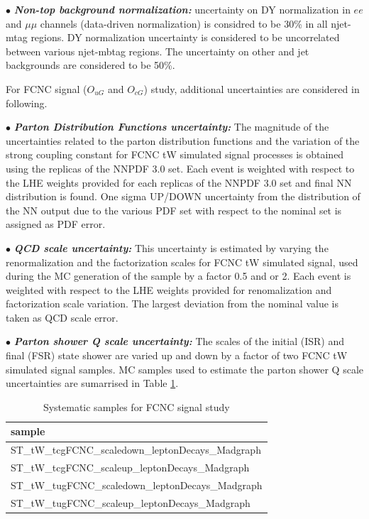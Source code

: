 $\bullet$ \textit{\textbf{Non-top background normalization:}} uncertainty on DY normalization in $ee$ and $\mu\mu$ channels (data-driven normalization) is considred to be 30\% in all njet-mtag regions. DY normalization uncertainty is considered to be uncorrelated between various njet-mbtag regions. The uncertainty on other and jet backgrounds are considered to be 50\%.

\medskip
For FCNC signal ($O_{uG}$ and $O_{cG}$) study, additional uncertainties are considered in following.

   $\bullet$ \textit{\textbf{Parton Distribution Functions uncertainty:}} The magnitude of the uncertainties related to the parton distribution functions and the variation of the strong coupling constant for FCNC tW simulated signal processes is obtained using the replicas of the NNPDF 3.0 set. Each event is weighted with respect to the LHE weights provided for each replicas of the NNPDF 3.0 set and final NN distribution is found. One sigma UP/DOWN uncertainty from the distribution of the NN output due to the various PDF set  with respect to  the nominal set is assigned as PDF error.

   $\bullet$ \textit{\textbf{QCD scale uncertainty:}} This uncertainty is estimated by varying the renormalization and the factorization scales for FCNC tW simulated signal, used during the MC generation of the sample by a factor 0.5 and or 2. Each event is weighted with respect to the LHE weights provided for renomalization and factorization scale variation. The largest deviation from the nominal value is taken as QCD scale error.

   $\bullet$ \textit{\textbf{Parton shower Q scale uncertainty:}} The scales of the initial (ISR) and final (FSR) state shower are varied up and down by a factor of two FCNC tW simulated signal samples. MC samples used to estimate the parton shower Q scale uncertainties are sumarrised in Table \ref{sysFCNC}.

\begin{table}[h]
\centering
\begin{tabular}{l}
\hline
sample                                                  \\
\hline
\hline
ST\_tW\_tcgFCNC\_scaledown\_leptonDecays\_Madgraph                \\
ST\_tW\_tcgFCNC\_scaleup\_leptonDecays\_Madgraph                \\
ST\_tW\_tugFCNC\_scaledown\_leptonDecays\_Madgraph               \\
ST\_tW\_tugFCNC\_scaleup\_leptonDecays\_Madgraph                \\
\hline
\end{tabular}
\caption{Systematic samples for FCNC signal study}
\label{sysFCNC}
\end{table}




